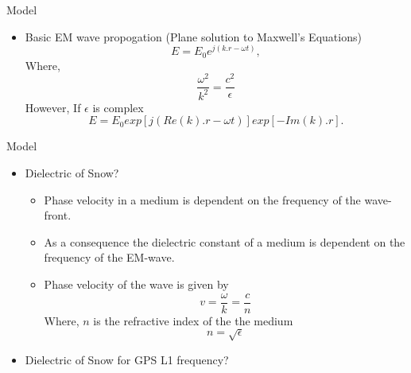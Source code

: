 \documentclass{beamer}
\begin{document}
\begin{frame}{Model}
\begin{itemize}
\item Basic EM wave propogation (Plane solution to Maxwell's Equations)
  \begin{equation}
    E = E_0e^{j(k.r -\omega t)},
  \end{equation}
  Where,
  \begin{equation*}
    \frac{\omega^2}{k^2}=\frac{c^2}{\epsilon}
  \end{equation*}
  However, If $\epsilon$ is complex
  \begin{equation}
    E = E_0 exp[j (Re(k).r - \omega t)]exp[-Im(k).r].
  \end{equation}
\end{itemize}
\end{frame}

\begin{frame}{Model}
\begin{itemize}
  \item Dielectric of Snow?
    \begin{itemize}
      \item Phase velocity in a medium is dependent on the frequency of the wave-front.
      \item As a consequence the dielectric constant of a medium is dependent on the frequency of the EM-wave.
      \item Phase velocity of the wave is given by
        \begin{equation*}
          v = \frac{\omega}{k} = \frac{c}{n}
        \end{equation*}
        Where, $n$ is the refractive index of the the medium
        \begin{equation*}
          n = \sqrt{\epsilon}
        \end{equation*}
    \end{itemize}
    \item Dielectric of Snow for GPS L1 frequency?
\end{itemize}
\end{frame}
\end{document}
